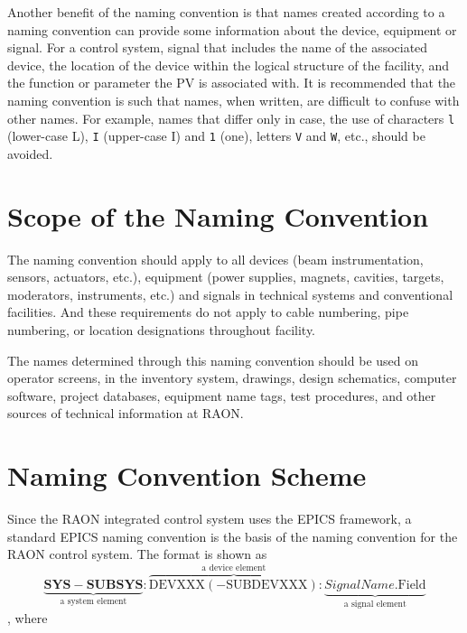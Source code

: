 \documentclass[11pt
  , a4paper
  , article
  , oneside
]{memoir}
\begin{document}
Another benefit of the naming convention is that names created according to a naming convention can provide some information about the device, equipment or signal. For a control system, signal that includes the name of the associated device, the location of the device within the logical structure of the facility, and the function or parameter the PV is associated with. It is recommended that the naming convention is such that names, when written, are difficult to confuse with other names. For example, names that differ only in case, the use of characters \texttt{l} (lower-case L), \texttt{I} (upper-case I) and \texttt{1} (one), letters \texttt{V} and \texttt{W}, etc., should be avoided.


\chapter{Scope of the Naming Convention \cite{DaveGurd,NCSNS,NCESS}}
The naming convention should apply to all devices (beam instrumentation, sensors, actuators, etc.), equipment (power supplies, magnets, cavities, targets, moderators, instruments, etc.) and signals in technical systems and conventional facilities. And these requirements do not apply to cable numbering, pipe numbering, or location designations throughout facility. 

The names determined through this naming convention should be used on operator screens, in the inventory system, drawings, design schematics, computer software, project databases, equipment name tags, test procedures, and other sources of technical information at RAON.


\chapter{Naming Convention Scheme}
Since the RAON integrated control system uses the EPICS framework, a standard EPICS naming convention is the basis of the naming convention for the RAON control system. The format is shown as 
\begin{equation*}
\underbrace{\mathbf{SYS-SUBSYS}}_\text{a system element}\mathbf{:}\overbrace{\mathrm{DEVXXX(-SUBDEVXXX)}}^\text{a device element}\mathbf{:}\underbrace{SignalName\mathbf{.}\mathrm{Field}}_\text{a signal element}
\end{equation*} 
, where 
\end{document}
